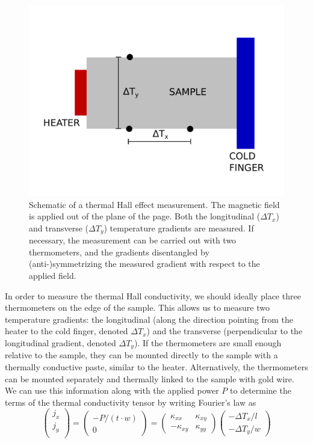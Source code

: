 \documentclass{thesis-umich}
\begin{document}
\begin{figure}
	\caption[Schematic of a thermal Hall effect measurement]{Schematic of a thermal Hall effect measurement. The magnetic field is applied out of the plane of the page. Both the longitudinal ($\Delta T_x$) and transverse ($\Delta T_y$) temperature gradients are measured. If necessary, the measurement can be carried out with two thermometers, and the gradients disentangled by (anti-)symmetrizing the measured gradient with respect to the applied field.}
	\label{fig:thall_geometry}
	\includegraphics[width=\columnwidth]{figures/thall_geometry.pdf}
\end{figure}
In order to measure the thermal Hall conductivity, we should ideally place three thermometers on the edge of the sample. This allows us to measure two temperature gradients: the longitudinal (along the direction pointing from the heater to the cold finger, denoted $\Delta T_x$) and the transverse (perpendicular to the longitudinal gradient, denoted $\Delta T_y$). If the thermometers are small enough relative to the sample, they can be mounted directly to the sample with a thermally conductive paste, similar to the heater. Alternatively, the thermometers can be mounted separately and thermally linked to the sample with gold wire. We can use this information along with the applied power $P$ to determine the terms of the thermal conductivity tensor by writing Fourier's law as
\[ \begin{pmatrix}
		j_x \\
		j_y \\
\end{pmatrix}
= \begin{pmatrix}
	-P/(t\cdot w) \\
	0
\end{pmatrix}
= \begin{pmatrix}
	\kappa_{xx} & \kappa_{xy} \\
	-\kappa_{xy} & \kappa_{yy} 
\end{pmatrix}
\begin{pmatrix}
	-\Delta T_x/l \\
	-\Delta T_y/w
\end{pmatrix} \]
\end{document}
